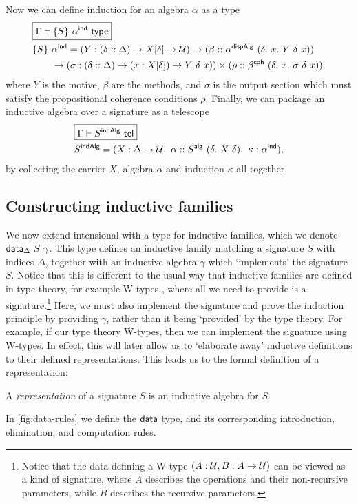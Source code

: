 Now we can define induction for an algebra $\alpha$ as a type
\begin{align*}
&\boxed{\Gamma \vdash \{S\}\ \alpha\IND \type} \\
&\{S\}\ \alpha\IND = (Y : (\delta :: \Delta) \to X[\delta] \to \univ) \to (\beta :: \alpha\D\ (\delta.\ x.\ Y\ \delta\ x)) \\
&\qquad\to (\sigma : (\delta :: \Delta) \to (x : X[\delta]) \to Y\ \delta\ x)) \times (\rho :: \beta\COH\ (\delta.\ x.\ \sigma\ \delta\ x)).
\end{align*}
where $Y$ is the motive, $\beta$ are the methods, and $\sigma$ is the output section which must
satisfy the propositional coherence conditions $\rho$.
Finally, we can package an inductive algebra over a signature as a telescope
\begin{align*}
&\boxed{\Gamma \vdash S\INDA \tel} \\
&S\INDA = (X : \Delta \to \univ,\ \alpha :: S\A\ (\delta.\ X\ \delta),\ \kappa : \alpha\IND),
\end{align*}
by collecting the carrier $X$, algebra $\alpha$ and induction $\kappa$ all together.

\subsection{Constructing inductive families}\label{sub:constructing-inductive-families}

We now extend intensional \lambdamltt with a type for inductive families, which we
denote $\textsf{data}_\Delta\ S\ \gamma$. This type defines an inductive family
matching a signature $S$ with indices $\Delta$, together with an inductive
algebra $\gamma$ which `implements' the signature $S$. Notice that this is
different to the usual way that inductive families are defined in type theory,
for example W-types \cite{Abbott2004-va}, where all we need to provide is
a signature.\footnote{
Notice that the data defining a W-type $(A : \mathcal{U}, B : A \to \mathcal{U})$ can be viewed as a kind of signature, where $A$ describes the
operations and their non-recursive parameters, while $B$ describes the recursive parameters.}
Here, we must also implement the signature and prove
the induction principle by providing $\gamma$, rather than it being `provided' by
the type theory. For example, if our type theory W-types, then we can
implement the signature using W-types. In effect, this will later allow us to
`elaborate away' inductive definitions to their defined representations.
This leads us to the formal definition of a representation:
\begin{definition}
A \emph{representation} of a signature $S$ is an inductive algebra for $S$.
\end{definition}
In \cref{fig:data-rules} we define the $\textsf{data}$ type, and its corresponding
introduction, elimination, and computation rules.

